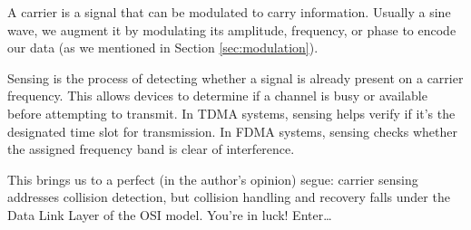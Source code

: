 \begin{importantblock}
    A carrier is a signal that can be modulated to carry information. Usually a sine wave, we augment it by modulating its amplitude, frequency, or phase to encode our data (as we mentioned in Section \ref{sec:modulation}).
\end{importantblock}

Sensing is the process of detecting whether a signal is already present on a carrier frequency. This allows devices to determine if a channel is busy or available before attempting to transmit. In TDMA systems, sensing helps verify if it's the designated time slot for transmission. In FDMA systems, sensing checks whether the assigned frequency band is clear of interference.

This brings us to a perfect (in the author's opinion) segue: carrier sensing addresses collision detection, but collision handling and recovery falls under the Data Link Layer of the OSI model. You're in luck! Enter\dots

